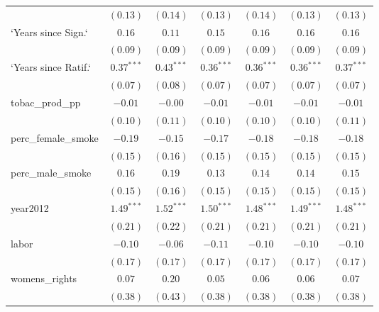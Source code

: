 \begin{table}[!h]
\begin{center}
\begin{tabular}{l c c c c c c }
                        & $(0.13)$     & $(0.14)$     & $(0.13)$     & $(0.14)$     & $(0.13)$     & $(0.13)$     \\
`Years since Sign.`     & $0.16$       & $0.11$       & $0.15$       & $0.16$       & $0.16$       & $0.16$       \\
                        & $(0.09)$     & $(0.09)$     & $(0.09)$     & $(0.09)$     & $(0.09)$     & $(0.09)$     \\
`Years since Ratif.`    & $0.37^{***}$ & $0.43^{***}$ & $0.36^{***}$ & $0.36^{***}$ & $0.36^{***}$ & $0.37^{***}$ \\
                        & $(0.07)$     & $(0.08)$     & $(0.07)$     & $(0.07)$     & $(0.07)$     & $(0.07)$     \\
tobac\_prod\_pp         & $-0.01$      & $-0.00$      & $-0.01$      & $-0.01$      & $-0.01$      & $-0.01$      \\
                        & $(0.10)$     & $(0.11)$     & $(0.10)$     & $(0.10)$     & $(0.10)$     & $(0.11)$     \\
perc\_female\_smoke     & $-0.19$      & $-0.15$      & $-0.17$      & $-0.18$      & $-0.18$      & $-0.18$      \\
                        & $(0.15)$     & $(0.16)$     & $(0.15)$     & $(0.15)$     & $(0.15)$     & $(0.15)$     \\
perc\_male\_smoke       & $0.16$       & $0.19$       & $0.13$       & $0.14$       & $0.14$       & $0.15$       \\
                        & $(0.15)$     & $(0.16)$     & $(0.15)$     & $(0.15)$     & $(0.15)$     & $(0.15)$     \\
year2012                & $1.49^{***}$ & $1.52^{***}$ & $1.50^{***}$ & $1.48^{***}$ & $1.49^{***}$ & $1.48^{***}$ \\
                        & $(0.21)$     & $(0.22)$     & $(0.21)$     & $(0.21)$     & $(0.21)$     & $(0.21)$     \\
labor                   & $-0.10$      & $-0.06$      & $-0.11$      & $-0.10$      & $-0.10$      & $-0.10$      \\
                        & $(0.17)$     & $(0.17)$     & $(0.17)$     & $(0.17)$     & $(0.17)$     & $(0.17)$     \\
womens\_rights          & $0.07$       & $0.20$       & $0.05$       & $0.06$       & $0.06$       & $0.07$       \\
                        & $(0.38)$     & $(0.43)$     & $(0.38)$     & $(0.38)$     & $(0.38)$     & $(0.38)$     \\

\end{tabular}
\end{center}
\end{table}
